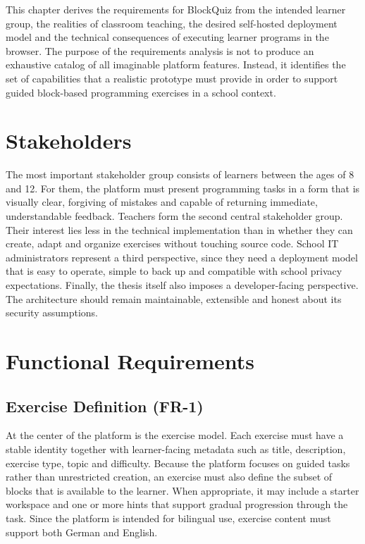 This chapter derives the requirements for BlockQuiz from the intended learner group, the realities of classroom teaching, the desired self-hosted deployment model and the technical
consequences of executing learner programs in the browser.
The purpose of the requirements analysis is not to produce an exhaustive catalog of all imaginable platform features. Instead, it identifies the set of capabilities that
a realistic prototype must provide in order to support guided block-based programming exercises in a school context.

\section{Stakeholders}
\label{sec:req-stakeholders}
The most important stakeholder group consists of learners between the ages of 8 and 12. For them, the platform must present programming tasks in a form that is visually clear, 
forgiving of mistakes and capable of returning immediate, understandable feedback.
Teachers form the second central stakeholder group. Their interest lies less in the technical implementation than in whether they can create, adapt and organize exercises without touching source code.
School IT administrators represent a third perspective, since they need a deployment model that is easy to operate, simple to back up and compatible with school privacy expectations.
Finally, the thesis itself also imposes a developer-facing perspective. The architecture should remain maintainable, extensible and honest about its security assumptions.

\section{Functional Requirements}
\label{sec:req-functional}
\subsection*{Exercise Definition (FR-1)}
At the center of the platform is the exercise model. Each exercise must have a stable identity together with learner-facing metadata such as title, description, exercise type, topic and difficulty.
Because the platform focuses on guided tasks rather than unrestricted creation, an exercise must also define the subset of blocks that is available to the learner.
When appropriate, it may include a starter workspace and one or more hints that support gradual progression through the task.
Since the platform is intended for bilingual use, exercise content must support both German and English.

